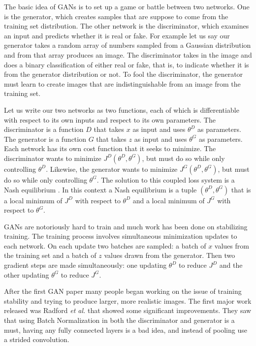 The basic idea of GANs is to set up a game or battle between two networks. One is the generator, which creates samples that are suppose to come from the training set distribution. The other network is the discriminator, which examines an input and predicts whether it is real or fake. For example let us say our generator takes a random array of numbers sampled from a Gaussian distribution and from that array produces an image. The discriminator takes in the image and does a binary classification of either real or fake, that is, to indicate whether it is from the generator distribution or not. To fool the discriminator, the generator must learn to create images that are indistinguishable from an image from the training set.

Let us write our two networks as two functions, each of which is differentiable with respect to its own inputs and respect to its own parameters. The discriminator is a function $D$ that takes $x$ as input and uses $\theta^D$ as parameters. The generator is a function $G$ that takes $z$ as input and uses $\theta^G$ as parameters. Each network has its own cost function that it seeks to minimize. The discriminator wants to minimize $J^D(\theta^D,\theta^G)$, but must do so while only controlling $\theta^D$. Likewise, the generator wants to minimize $J^G(\theta^D,\theta^G)$, but must do so while only controlling $\theta^G$. The solution to this coupled loss system is a Nash equilibrium \cite{ratliff2013characterization}. In this context a Nash equilibrium is a tuple $(\theta^D,\theta^G)$ that is a local minimum of $J^D$ with respect to $\theta^D$ and a local minimum of $J^G$ with respect to $\theta^G$.

GANs are notoriously hard to train and much work has been done on stabilizing training. The training process involves simultaneous minimization updates to each network. On each update two batches are sampled: a batch of $x$ values from the training set and a batch of $z$ values drawn from the generator. Then two gradient steps are made simultaneously: one updating $\theta^D$ to reduce $J^D$ and the other updating $\theta^G$ to reduce $J^G$. 

After the first GAN paper many people began working on the issue of training stability and trying to produce larger, more realistic images. The first major work released was Radford \textit{et al.} \cite{radford2015unsupervised} that showed some significant improvements. They saw that using Batch Normalization in both the discriminator and generator is a must, having any fully connected layers is a bad idea, and instead of pooling use a strided convolution.

